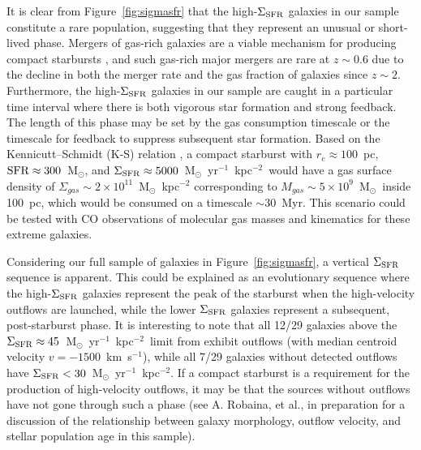 \documentclass[apj]{emulateapj}
\newcommand{\kms}{km~s$^{-1}$}
\newcommand{\msun}{M$_{\odot}$}
\newcommand{\units}{M$_{\odot}$~yr$^{-1}$~kpc$^{-2}$}
\newcommand{\sigmasfr}{\Sigma_{\textnormal{\scriptsize{SFR}}}}
\begin{document}
It is clear from Figure~\ref{fig:sigmasfr} that the high-$\sigmasfr$
galaxies in our sample constitute a rare population, suggesting that
they represent an unusual or short-lived phase.  Mergers of gas-rich
galaxies are a viable mechanism for producing compact starbursts
\citep[e.g.,][]{mih96}, and such gas-rich major mergers are rare at
$z\sim0.6$ due to the decline in both the merger rate
\citep[e.g.,][]{lot11} and the gas fraction \citep[e.g.,][]{tac10} of
galaxies since $z\sim2$.  Furthermore, the high-$\sigmasfr$ galaxies
in our sample are caught in a particular time interval where there is
both vigorous star formation and strong feedback.  The length of this
phase may be set by the gas consumption timescale or the timescale for
feedback to suppress subsequent star formation.  Based on the
Kennicutt--Schmidt (K-S) relation \citep{ken98}, a compact starburst
with $r_e\approx100$~pc, $\textnormal{SFR}\approx300$~\msun, and
$\sigmasfr\approx5000$~\units\ would have a gas surface density of
$\Sigma_{gas}\sim2\times10^{11}$~\msun~kpc$^{-2}$ corresponding to
$M_{gas}\sim5\times10^{9}$~\msun\ inside 100~pc, which would be
consumed on a timescale $\sim30$~Myr.  This scenario could be tested
with CO observations of molecular gas masses and kinematics for these
extreme galaxies.


Considering our full sample of galaxies in Figure~\ref{fig:sigmasfr},
a vertical $\sigmasfr$ sequence is apparent.  This could be explained
as an evolutionary sequence where the high-$\sigmasfr$ galaxies
represent the peak of the starburst when the high-velocity outflows
are launched, while the lower $\sigmasfr$ galaxies represent a
subsequent, post-starburst phase.  It is interesting to note that all
12/29 galaxies above the $\sigmasfr\approx45$~\units\ limit from
\citet{meu97} exhibit outflows (with median centroid velocity
$v=-1500$~\kms), while all 7/29 galaxies without detected outflows
have $\sigmasfr<30$~\units.  If a compact starburst is a requirement
for the production of high-velocity outflows, it may be that the
sources without outflows have not gone through such a phase (see
A. Robaina, et al., in preparation for a discussion of the
relationship between galaxy morphology, outflow velocity, and stellar
population age in this sample).
\end{document}
